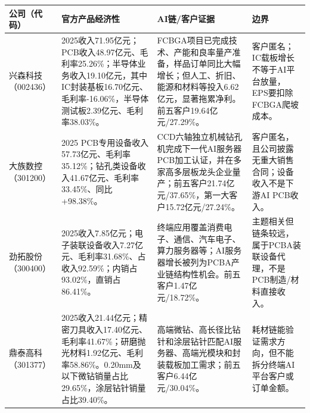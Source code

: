 \begin{exhibitbox}
\footnotesize
\begin{tabularx}{\textwidth}{L{1.8cm}X X X}
\toprule
\textbf{公司（代码）} & \textbf{官方产品经济性} & \textbf{AI链/客户证据} & \textbf{边界} \\
\midrule
兴森科技（002436） & 2025收入71.95亿元；PCB收入48.97亿元、毛利率25.26\%；半导体业务收入19.10亿元，其中IC封装基板16.70亿元、毛利率-16.06\%，半导体测试板2.39亿元、毛利率38.03\%。 & FCBGA项目已完成技术、产能和良率量产准备，样品订单同比大幅增长；但人工、折旧、能源和材料等投入6.62亿元，显著拖累净利。前五客户19.64亿元/27.29\%。 & 客户匿名；IC载板增长不等于AI平台放量，EPS要扣除FCBGA爬坡成本。 \\
大族数控（301200） & 2025 PCB专用设备收入57.73亿元、毛利率35.12\%；钻孔类设备收入41.67亿元、毛利率33.45\%、同比+98.38\%。 & CCD六轴独立机械钻孔机完成下一代AI服务器PCB加工认证，并在多家高多层板龙头企业量产；前五客户21.74亿元/37.65\%，第一大客户15.72亿元/27.24\%。 & 客户匿名，且公司披露无重大销售合同；设备收入不是下游AI PCB收入。 \\
劲拓股份（300400） & 2025收入7.85亿元；电子装联设备收入7.27亿元、毛利率31.68\%、占收入92.59\%；内销占93.02\%，直销占86.41\%。 & 终端应用覆盖消费电子、通信、汽车电子、算力服务器等；AI服务器增长被列为PCBA产业链结构性机会。前五客户1.47亿元/18.72\%。 & 主题相关但链条较远，属于PCBA装联设备代理，不是PCB制造/材料直接收入。 \\
鼎泰高科（301377） & 2025收入21.44亿元；精密刀具收入17.40亿元、毛利率41.67\%；研磨抛光材料1.92亿元、毛利率58.86\%。0.20mm及以下微钻销量占比29.65\%，涂层钻针销量占比39.40\%。 & 高端微钻、高长径比钻针和涂层钻针匹配AI服务器、高端光模块和封装载板加工需求；前五客户6.44亿元/30.04\%。 & 耗材链能验证需求方向，但不能拆分终端AI平台客户或订单金额。 \\
\bottomrule
\end{tabularx}
\end{exhibitbox}

